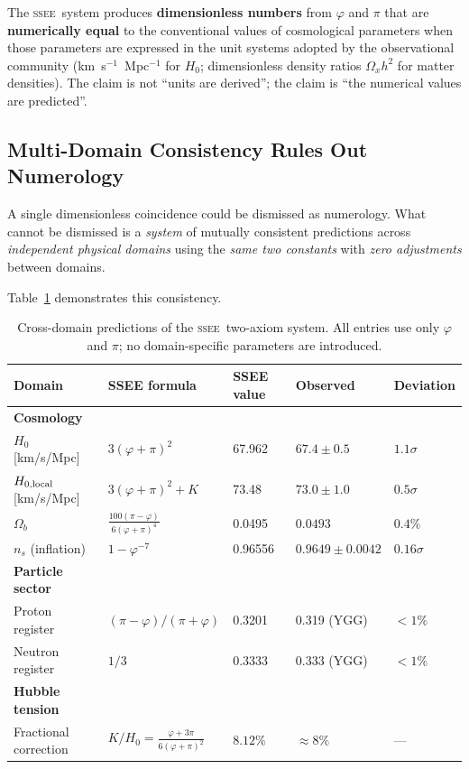 \documentclass[12pt,a4paper]{article}
\newcommand{\SSEE}{\ifmmode\mathrm{SSEE}\else\textsc{ssee}\fi}
\begin{document}
\begin{tcolorbox}[colback=blue!5,colframe=blue!50,title=Scope of SSEE Predictions]
The \SSEE\ system produces \textbf{dimensionless numbers} from $\varphi$ and
$\pi$ that are \textbf{numerically equal} to the conventional values of
cosmological parameters when those parameters are expressed in the unit
systems adopted by the observational community
(km~s$^{-1}$~Mpc$^{-1}$ for $H_0$; dimensionless density ratios $\Omega_x h^2$
for matter densities).
The claim is not ``units are derived''; the claim is
``the numerical values are predicted''.
\end{tcolorbox}

\subsection{Multi-Domain Consistency Rules Out Numerology}
\label{sec:numerology}

A single dimensionless coincidence could be dismissed as numerology.
What cannot be dismissed is a \emph{system} of mutually consistent predictions
across \emph{independent physical domains} using the \emph{same two constants}
with \emph{zero adjustments} between domains.

Table~\ref{tab:cross} demonstrates this consistency.

\begin{table}[ht]
\centering
\caption{Cross-domain predictions of the \SSEE\ two-axiom system.
All entries use only $\varphi$ and $\pi$; no domain-specific parameters
are introduced.}
\label{tab:cross}
\begin{tabular}{lllll}
\toprule
Domain & SSEE formula & SSEE value & Observed & Deviation \\
\midrule
\textbf{Cosmology} & & & & \\
\quad $H_0$ [km/s/Mpc] & $3(\varphi+\pi)^2$ & 67.962 & $67.4\pm0.5$ & $1.1\sigma$ \\
\quad $H_{0,\rm local}$ [km/s/Mpc] & $3(\varphi+\pi)^2 + K$ & 73.48  & $73.0\pm1.0$ & $0.5\sigma$ \\
\quad $\Omega_b$ & $\frac{100(\pi-\varphi)}{6(\varphi+\pi)^4}$ & 0.0495 & $0.0493$ & $0.4\%$ \\
\quad $n_s$ (inflation) & $1-\varphi^{-7}$ & 0.96556 & $0.9649\pm0.0042$ & $0.16\sigma$ \\
\textbf{Particle sector} & & & & \\
\quad Proton register & $(\pi-\varphi)/(\pi+\varphi)$ & 0.3201 & 0.319 (YGG) & $<1\%$ \\
\quad Neutron register & $1/3$ & 0.3333 & 0.333 (YGG) & $<1\%$ \\
\textbf{Hubble tension} & & & & \\
\quad Fractional correction & $K/H_0 = \frac{\varphi+3\pi}{6(\varphi+\pi)^2}$ & $8.12\%$ & $\approx 8\%$ & — \\
\bottomrule
\end{tabular}
\end{table}
\end{document}
